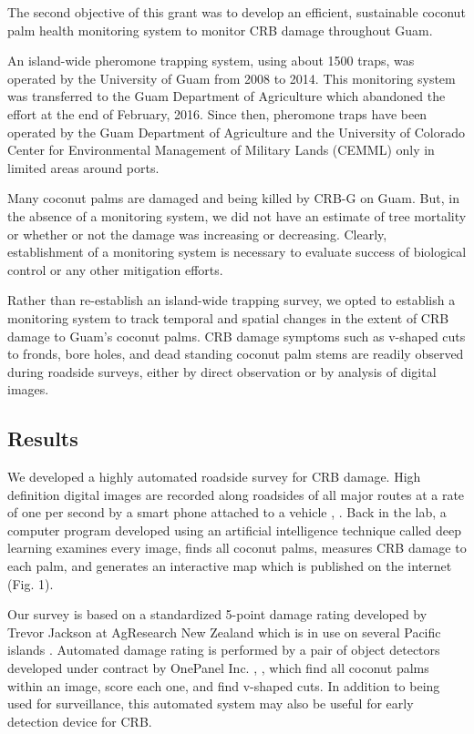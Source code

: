 \documentclass[12pt,letterpaper,english,bibliography=totocnumbered,abstract=on]{scrartcl}
\begin{document}
\begin{refsection}

The second objective of this grant was to develop an efficient, sustainable coconut palm health monitoring system to monitor CRB damage throughout Guam. 
	
An island-wide pheromone trapping system, using about 1500 traps, was operated by the University of Guam from 2008 to 2014. This monitoring system was transferred to the Guam Department of Agriculture which abandoned the effort at the end of February, 2016. Since then, pheromone traps have been operated by the Guam Department of Agriculture and the University of Colorado Center for Environmental Management of Military Lands (CEMML) only in limited areas around ports.

Many coconut palms are damaged and being killed by CRB-G on Guam. But, in the absence of a monitoring system, we did not have an estimate of tree mortality or whether or not the damage was increasing or decreasing. Clearly, establishment of a monitoring system is necessary to evaluate success of biological control or any other mitigation efforts.

Rather than re-establish an island-wide trapping survey, we opted to establish a monitoring system to track temporal and spatial changes in the extent of CRB damage to Guam's coconut palms. CRB damage symptoms such as v-shaped cuts to fronds, bore holes, and dead standing coconut palm stems are readily observed during roadside surveys, either by direct observation or by analysis of digital images.

\subsection{Results}

We developed a highly automated roadside survey for CRB damage.
High definition digital images are recorded along roadsides of all major routes at a rate of one per second by a smart phone attached to a vehicle \cite{mooreSetAutomatedRoadside2020}, \cite{mooreYouTubeVideoMounting2020}. Back in the lab, a computer program developed using an artificial intelligence technique called deep learning examines every image, finds all coconut palms, measures CRB damage to each palm, and generates an interactive map which is published on the internet (Fig. 1).

Our survey is based on a standardized 5-point damage rating developed by Trevor Jackson at AgResearch New Zealand which is in use on several Pacific islands \cite{mooreAutomatedRoadsideVideo2020}. Automated damage rating is performed by a pair of object detectors developed under contract by OnePanel Inc. \cite{mooreRequestInterestObject2020}, \cite{onepanelinc.ScopeWorkObject2020}, \cite{onepanelinc.AIPipelineOperations2020} which find all coconut palms within an image, score each one, and find v-shaped cuts. In addition to being used for surveillance, this automated system may also be useful for early detection device for CRB.


\end{refsection}
\end{document}
